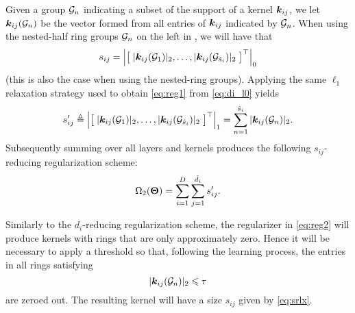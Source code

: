 Given a group $\mathcal{G}_n$ indicating a subset of the support of a kernel $\bm{k}_{ij}$, we let $\bm{k}_{ij}( \mathcal{G}_n)$ be the vector formed from all entries of $\bm{k}_{ij}$ indicated by $\mathcal{G}_n$. When using the nested-half ring groups $ \mathcal{G}_n $ on the left in , we will have that
\begin{equation} 
s_{ij} = \left | \big [ \; |\bm{k}_{ij}( \mathcal{G}_1)|_2, \ldots,  | \bm{k}_{ij}( \mathcal{G}_{\hat{s}_i})|_2 \;  \big ]^{\top} \right |_0
\end{equation}
(this is also the case when using the nested-ring groups). Applying the same $\ell_1$ relaxation strategy used to obtain \eqref{eq:reg1} from \eqref{eq:di_l0} yields
\begin{equation} \label{eq:srlx}
\srlx_{ij} \triangleq \left | \big [ \; |\mv k_{ij}( \ms G_1)|_2, \ldots,  | \mv k_{ij}( \ms G_{\smax_i})|_2 \;  \big ]^\Tr \right |_1 = \sum_{n=1}^{\smax_i} | \mm k_{ij}(\ms G_n) |_2 . %
\end{equation}
Subsequently summing over all layers and kernels produces the following $s_{ij}$-reducing regularization scheme:
\begin{equation}\label{eq:reg2}
  \Omega_2(\bm{\Theta}) = \sum_{i=1}^D\sum_{j=1}^{\hat{d}_i} s^\prime_{ij}.
\end{equation}

Similarly to the $d_i$-reducing regularization scheme, the regularizer in \eqref{eq:reg2} will produce kernels with rings that are only approximately zero. Hence it will be necessary to apply a threshold so that, following the learning process, the entries in all rings satisfying
\begin{equation}
  |\bm{k}_{ij}(\mathcal{G}_n)|_2 \leqslant \tau
\end{equation}
are zeroed out. The resulting kernel will have a size $s_{ij}$ given by \eqref{eq:srlx}.



